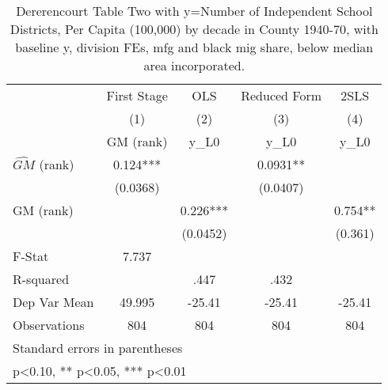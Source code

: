 \begin{table}[htbp]\centering
\def\sym#1{\ifmmode^{#1}\else\(^{#1}\)\fi}
\caption{Dererencourt Table Two with y=Number of Independent School Districts, Per Capita (100,000) by decade in County 1940-70, with baseline y, division FEs, mfg and black mig share, below median area incorporated.}
\begin{tabular}{l*{4}{c}}
\toprule
                    & First Stage   &         OLS   &Reduced Form   &        2SLS   \\
                    &\multicolumn{1}{c}{(1)}&\multicolumn{1}{c}{(2)}&\multicolumn{1}{c}{(3)}&\multicolumn{1}{c}{(4)}\\
                    &\multicolumn{1}{c}{GM  (rank)}&\multicolumn{1}{c}{y\_L0}&\multicolumn{1}{c}{y\_L0}&\multicolumn{1}{c}{y\_L0}\\
\midrule
$\hat{GM}$ (rank)   &       0.124***&               &      0.0931** &               \\
                    &    (0.0368)   &               &    (0.0407)   &               \\
\addlinespace
GM  (rank)          &               &       0.226***&               &       0.754** \\
                    &               &    (0.0452)   &               &     (0.361)   \\
\midrule
F-Stat              &       7.737   &               &               &               \\
R-squared           &               &        .447   &        .432   &               \\
Dep Var Mean        &      49.995   &      -25.41   &      -25.41   &      -25.41   \\
Observations        &         804   &         804   &         804   &         804   \\
\bottomrule
\multicolumn{5}{l}{\footnotesize Standard errors in parentheses}\\
\multicolumn{5}{l}{\footnotesize * p<0.10, ** p<0.05, *** p<0.01}\\
\end{tabular}
\end{table}
